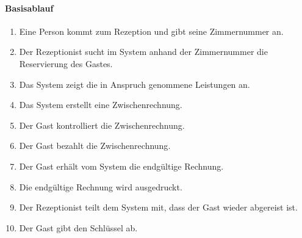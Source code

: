 \paragraph{Basisablauf}
\begin{enumerate}
	\item Eine Person kommt zum \Gls{Rezeption} und gibt seine \Gls{Zimmernummer} an.
	\item Der \Gls{Rezeptionist} sucht im System anhand der \Gls{Zimmernummer} die Reservierung des \Gls{Gast}es.
	\item Das System zeigt die in Anspruch genommene Leistungen an.
    \item Das System erstellt eine \Gls{Zwischenrechnung}.
	\item Der \Gls{Gast} kontrolliert die \Gls{Zwischenrechnung}.
	\item Der \Gls{Gast} bezahlt die \Gls{Zwischenrechnung}.
	\item Der \Gls{Gast} erhält vom System die endgültige \Gls{Rechnung}.
	\item Die endgültige \Gls{Rechnung} wird ausgedruckt.
	\item Der \Gls{Rezeptionist} teilt dem System mit, dass der \Gls{Gast} wieder abgereist ist.
	\item Der \Gls{Gast} gibt den Schlüssel ab.
\end{enumerate}

